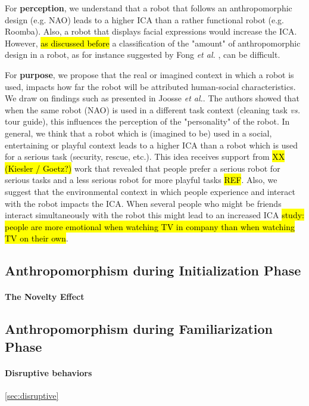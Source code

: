 \documentclass[twocolumn]{svjour3}          %
\begin{document}
	For \textbf{perception}, we understand that a robot that follows an anthropomorphic design (e.g. NAO) leads to a higher ICA than a rather functional robot (e.g. Roomba). Also, a robot that displays facial expressions would increase the ICA. However, \hl{as discussed before} a classification of the "amount" of anthropomorphic design in a robot, as for instance suggested by Fong \textit{et al.} \cite{fong_survey_2003}, can be difficult.
	
	For \textbf{purpose}, we propose that the real or imagined context in which a robot is used, impacts how far the robot will be attributed human-social characteristics. We	draw on findings such as presented in Joosse \textit{et al.}. The authors showed that when the same robot (NAO) is used in a different task context (cleaning task \textit{vs.} tour guide), this influences the perception of the "personality" of the robot. In general, we think that a robot which is (imagined to be) used in a social, entertaining or playful context leads to a higher ICA than a robot which is used for a serious task (security, rescue, etc.). This idea receives support from \hl{XX (Kiesler / Goetz?)} work that revealed that people prefer a serious robot for serious tasks and a less serious robot for more playful tasks \hl{REF}. Also, we suggest that the environmental context in which people experience and interact with the robot impacts the ICA. When several people who might be friends interact simultaneously with the robot this might lead to an increased ICA \hl{study: people are more emotional when watching TV in company than when watching TV on their own}.

\subsection{Anthropomorphism during Initialization Phase}
\label{sec:initialization}

\paragraph{The Novelty Effect}
\label{sec:noveltyeffect}

\subsection{Anthropomorphism during Familiarization Phase}
\label{sec:familiarization}

\paragraph{Disruptive behaviors}
\ref{sec:disruptive}
\end{document}
